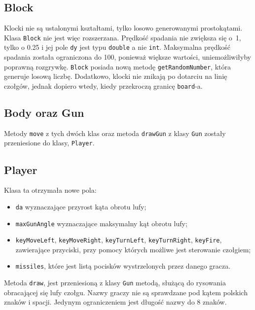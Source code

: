 \documentclass[12pt]{report}
\newcommand{\code}[1]{\texttt{#1}}
\begin{document}
     \subsection{Block}
     Klocki nie są ustalonymi kształtami, tylko losowo generowanymi prostokątami. Klasa \code{Block} nie jest więc rozszerzana. Prędkość spadania nie zwiększa się o~1, tylko o 0.25 i jej pole \code{dy} jest typu \code{double} a nie \code{int}. Maksymalna prędkość spadania została ograniczona do 100, ponieważ większe wartości, uniemożliwiłyby poprawną rozgrywkę. \code{Block} posiada nową metodę \code{getRandomNumber}, która generuje losową liczbę. Dodatkowo, klocki nie znikają po dotarciu na linię czołgów, jednak dopiero wtedy, kiedy przekroczą granicę \code{board}-a.
     
     \subsection{Body oraz Gun}
     Metody \code{move} z tych dwóch klas oraz metoda \code{drawGun} z klasy \code{Gun} zostały przeniesione do klasy, \code{Player}.
     
     \subsection{Player}
     Klasa ta otrzymała nowe pola:
     \begin{itemize}
         \item \code{da} wyznaczające przyrost kąta obrotu lufy;
         \item \code{maxGunAngle} wyznaczające maksymalny kąt obrotu lufy;
         \item \code{keyMoveLeft}, \code{keyMoveRight}, \code{keyTurnLeft}, \code{keyTurnRight}, \code{keyFire}, zawierające przyciski, przy pomocy których możliwe jest sterowanie czołgiem;
         \item \code{missiles}, które jest listą pocisków wystrzelonych przez danego gracza.
     \end{itemize}
        Metoda \code{draw}, jest przeniesioną z klasy \code{Gun} metodą, służącą do rysowania obracającej się lufy czołgu. Nazwy graczy nie są sprawdzane pod kątem polskich znaków i spacji. Jedynym ograniczeniem jest długość nazwy do 8 znaków.
        
\end{document}
